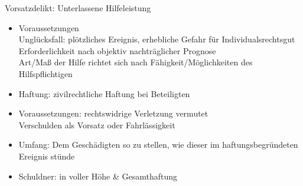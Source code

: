 \begin{hintbox}{Vorsatzdelikt: Unterlassene Hilfeleistung}
    \begin{itemize}
        \item Voraussetzungen\\
        \ra Unglücksfall: plötzliches Ereignis, erhebliche Gefahr für Individualsrechtsgut\\
        \ra Erforderlichkeit nach objektiv nachträglicher Prognose\\
        \ra Art/Maß der Hilfe richtet sich nach Fähigkeit/Möglichkeiten des Hilfspflichtigen
        \item Haftung: zivilrechtliche Haftung bei Beteiligten
        \item Voraussetzungen: rechtswidrige Verletzung vermutet\\
        \ra Verschulden als Vorsatz oder Fahrlässigkeit
        \item Umfang: Dem Geschädigten so zu stellen, wie dieser im haftungsbegründeten Ereignis stünde
        \item Schuldner: in voller Höhe \& Gesamthaftung  
    \end{itemize}
\end{hintbox}
